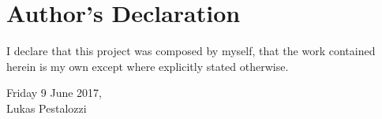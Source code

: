 \chapter*{Author's Declaration}

I declare that this project was composed by myself, that the work contained herein is
my own except where explicitly stated otherwise.

Friday 9 June 2017,\\[2cm]
Lukas Pestalozzi
